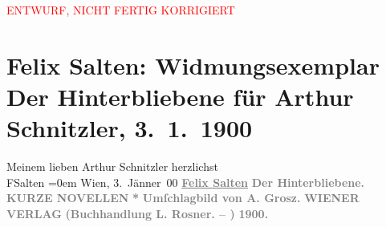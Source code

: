 
\begin{center}
            \textcolor{red}{ENTWURF, NICHT FERTIG KORRIGIERT}
                      \end{center}
            
         
         \renewcommand{\erwaehntePersonen}{Personen: Adolf Grosz}
         \renewcommand{\erwaehnteInstitutionen}{Institutionen: Buchhandlung L. Rosner, Wiener Verlag}
         \renewcommand{\erwaehnteOrte}{Orte: Wien}
         \renewcommand{\erwaehnteWerke}{Werke: Der Hinterbliebene. Kurze Novellen}
               \section[Felix Salten: Widmungsexemplar Der Hinterbliebene für Arthur Schnitzler, 3. 1. 1900]{ Felix Salten: Widmungsexemplar Der Hinterbliebene für Arthur
               Schnitzler, 3. 1. 1900}\nopagebreak{}\rehead{ }\begin{ledgroupsized}[t]{13cm}\normalsize\beginnumbering \toendnotes[C]{\smallbreak\pagebreak[2]} 
\toendnotes[C]{\smallbreak}\pstart
           \noindent{}{\pb}Meinem lieben Arthur Schnitzler\pend
           \pstart
           herzlichst{\\[\baselineskip]}\spacefill\mbox{FSalten}\pend
           \leftskip=0em{}\pstart
           Wien, 3. Jänner 00\pend
           {\bigskip}\pstart
           \noindent{}\textcolor{gray}{\textbf{\uline{Felix Salten}}}\pend
           \pstart
           \centering{}\textcolor{gray}{\textbf{Der Hinterbliebene.}}\pend
           \pstart
           \noindent{}\centering{}\textcolor{gray}{\textbf{KURZE NOVELLEN}}\pend
           \pstart
           \noindent{}\centering{}\textcolor{gray}{\textbf{*}}\pend
           \pstart
           \noindent{}\centering{}\textcolor{gray}{\textbf{Umſchlagbild von A.
                     Grosz.}}\pend
           {\bigskip}\pstart
           \noindent{}\centering{}\textcolor{gray}{\textbf{WIENER VERLAG}}\pend
           \pstart
           \noindent{}\centering{}\textcolor{gray}{\textbf{(Buchhandlung L. Rosner. –
                     \label{K_L03048-1v}\label{K_L03048-1h})}}\pend
           \pstart
           \noindent{}\centering{}\textcolor{gray}{\textbf{1900. }}\pend
           

\end{ledgroupsized}
